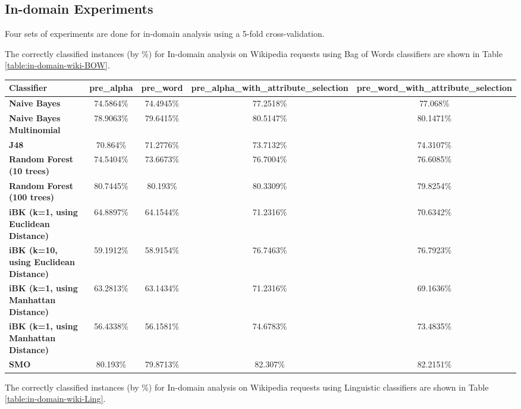 \documentclass[conference]{IEEEtran}
\begin{document}
\subsection{In-domain Experiments}
Four sets of experiments are done for in-domain analysis using a 5-fold cross-validation. 

The correctly classified instances (by \%) for In-domain analysis on Wikipedia requests using Bag of Words classifiers are shown in Table \ref{table:in-domain-wiki-BOW}.

\begin{table*}[htbp]
\caption{In-domain analysis on Wikipedia requests using Bag of Words classifiers }
\centering
\vspace{5pt}
\begin{tabular}{|l|c|c|c|c|}
\hline
\textbf{Classifier} & \textbf{pre\_alpha} & \textbf{pre\_word} & \textbf{pre\_alpha\_with\_attribute\_selection} & \textbf{pre\_word\_with\_attribute\_selection} \\
\hline\hline
\textbf{Naive Bayes} & 74.5864\% & 74.4945\% & 77.2518\% & 77.068\% \\ 
\hline
\textbf{Naive Bayes Multinomial} & 78.9063\% & 79.6415\% & 80.5147\% & 80.1471\% \\ 
\hline
\textbf{J48} & 70.864\% & 71.2776\% & 73.7132\% & 74.3107\% \\ 
\hline
\textbf{Random Forest (10 trees)} & 74.5404\% & 73.6673\% & 76.7004\% & 76.6085\% \\ 
\hline
\textbf{Random Forest (100 trees)} & 80.7445\% & 80.193\% & 80.3309\% & 79.8254\% \\ 
\hline
\textbf{iBK (k=1, using Euclidean Distance)} & 64.8897\% & 64.1544\% & 71.2316\% & 70.6342\% \\ 
\hline
\textbf{iBK (k=10, using Euclidean Distance)} & 59.1912\% & 58.9154\% & 76.7463\% & 76.7923\% \\ 
\hline
\textbf{iBK (k=1, using Manhattan Distance)} & 63.2813\% & 63.1434\% & 71.2316\% & 69.1636\% \\ 
\hline
\textbf{iBK (k=1, using Manhattan Distance)} & 56.4338\% & 56.1581\% & 74.6783\% & 73.4835\% \\ 
\hline
\textbf{SMO} & 80.193\% & 79.8713\% & 82.307\% & 82.2151\% \\ 
\hline
\hline
\end{tabular}
\label{table:in-domain-wiki-BOW}
\end{table*}

The correctly classified instances (by \%) for In-domain analysis on Wikipedia requests using Linguistic classifiers are shown in Table \ref{table:in-domain-wiki-Ling}.
\end{document}
